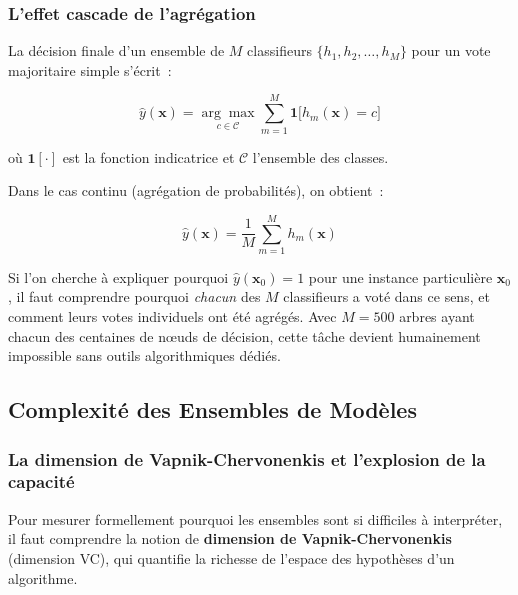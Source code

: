 \subsubsection{L'effet cascade de l'agrégation}

La décision finale d'un ensemble de $M$ classifieurs $\{h_1, h_2, \ldots, h_M\}$ pour
un vote majoritaire simple s'écrit~:

\begin{equation}
  \hat{y}(\mathbf{x}) = \underset{c \in \mathcal{C}}{\arg\max}
  \sum_{m=1}^{M} \mathbf{1}\bigl[h_m(\mathbf{x}) = c\bigr]
  \label{eq:vote_majoritaire}
\end{equation}

où $\mathbf{1}[\cdot]$ est la fonction indicatrice et $\mathcal{C}$ l'ensemble des classes.

Dans le cas continu (agrégation de probabilités), on obtient~:

\begin{equation}
  \hat{y}(\mathbf{x}) = \frac{1}{M} \sum_{m=1}^{M} h_m(\mathbf{x})
  \label{eq:moyenne_ensemble}
\end{equation}

Si l'on cherche à expliquer pourquoi $\hat{y}(\mathbf{x}_0) = 1$ pour une instance particulière
$\mathbf{x}_0$, il faut comprendre pourquoi \textit{chacun} des $M$ classifieurs a voté dans ce sens,
et comment leurs votes individuels ont été agrégés. Avec $M = 500$ arbres ayant chacun des
centaines de nœuds de décision, cette tâche devient humainement impossible sans outils
algorithmiques dédiés.

\subsection{Complexité des Ensembles de Modèles}

\subsubsection{La dimension de Vapnik-Chervonenkis et l'explosion de la capacité}

Pour mesurer formellement pourquoi les ensembles sont si difficiles à interpréter,
il faut comprendre la notion de \textbf{dimension de Vapnik-Chervonenkis} (dimension VC),
qui quantifie la richesse de l'espace des hypothèses d'un algorithme.

